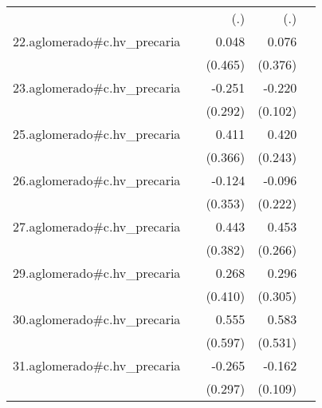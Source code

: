 {\begin{longtable}{l*{4}{D{.}{.}{-1}}}
            &                     &         (.)         &         (.)         &                     \\
\addlinespace
22.aglomerado#c.hv\_precaria&                     &       0.048         &       0.076         &                     \\
            &                     &     (0.465)         &     (0.376)         &                     \\
\addlinespace
23.aglomerado#c.hv\_precaria&                     &      -0.251         &      -0.220\sym{*}  &                     \\
            &                     &     (0.292)         &     (0.102)         &                     \\
\addlinespace
25.aglomerado#c.hv\_precaria&                     &       0.411         &       0.420         &                     \\
            &                     &     (0.366)         &     (0.243)         &                     \\
\addlinespace
26.aglomerado#c.hv\_precaria&                     &      -0.124         &      -0.096         &                     \\
            &                     &     (0.353)         &     (0.222)         &                     \\
\addlinespace
27.aglomerado#c.hv\_precaria&                     &       0.443         &       0.453         &                     \\
            &                     &     (0.382)         &     (0.266)         &                     \\
\addlinespace
29.aglomerado#c.hv\_precaria&                     &       0.268         &       0.296         &                     \\
            &                     &     (0.410)         &     (0.305)         &                     \\
\addlinespace
30.aglomerado#c.hv\_precaria&                     &       0.555         &       0.583         &                     \\
            &                     &     (0.597)         &     (0.531)         &                     \\
\addlinespace
31.aglomerado#c.hv\_precaria&                     &      -0.265         &      -0.162         &                     \\
            &                     &     (0.297)         &     (0.109)         &                     \\

\end{longtable}}
